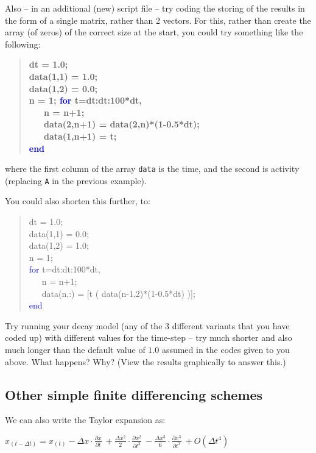 \documentclass{tufte-book} %
\newenvironment{docspec}{\begin{quotation}\ttfamily\parskip0pt\parindent0pt\ignorespaces}{\end{quotation}}
\newenvironment{docspecbold}{\begin{quotation}\ttfamily\bfseries\parskip0pt\parindent0pt\ignorespaces}{\end{quotation}}
\begin{document}
Also -- in an additional (new) script file -- try coding the storing of the results  in the form of a single matrix, rather than 2 vectors. For this, rather than create the array (of zeros) of the correct size at the start, you could try something like the following:
\begin{docspecbold}
dt = 1.0;\\
data(1,1) = 1.0;\\
data(1,2) = 0.0;\\
n = 1;
\textcolor{blue}{for} t=dt:dt:100*dt,\\
\ \ \ n = n+1;\\
\ \ \ data(2,n+1) = data(2,n)*(1-0.5*dt);\\
\ \ \ data(1,n+1) = t;\\
\textcolor{blue}{end}
\end{docspecbold}
where the first column of the array \texttt{data} is the time, and the second is activity (replacing \texttt{A} in the previous example).

You could also shorten this further, to:
\begin{docspec}
dt = 1.0;\\
data(1,1) = 0.0;\\
data(1,2) = 1.0;\\
n = 1;\\
\textcolor{blue}{for} t=dt:dt:100*dt,\\
\ \ \ n = n+1;\\
\ \ \ data(n,:) = [t ( data(n-1,2)*(1-0.5*dt) )];\\
\textcolor{blue}{end}
\end{docspec}

Try running your decay model (any of the 3 different variants that you have coded up) with different values for the time-step -- try much shorter and also much longer than the default value of \(1.0\) assumed in the codes given to you above. What happens? Why? (View the results graphically to answer this.)

%
\newpage


\subsection*{Other simple finite differencing schemes}

We can also write the Taylor expansion as:

\vspace{2mm}\(
x_{(t-\Delta t)}=x_{(t)} - \Delta x\cdot\frac{\partial x}{\partial t}\ + \frac{\Delta x^{2}}{2}\cdot\frac{\partial x^{2}}{\partial t^{2}}\ - \frac{\Delta x^{3}}{6}\cdot\frac{\partial x^{3}}{\partial t^{3}}\ + O(\Delta t^{4})
\)\vspace{2mm}
\end{document}
